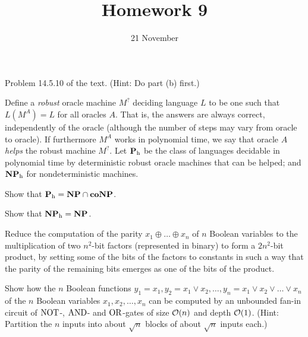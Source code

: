 \documentclass{../math167}
\title{Homework 9}
\author{}
\date{21 November}
\begin{document}
\begin{problems}
\item Problem 14.5.10 of the text.  (Hint: Do part (b) first.)

  \newcommand{\h}{_\mathrm h}

  \begin{book}

    Define a \emph{robust} oracle machine \(M^?\) deciding language
    \(L\) to be one such that \(L(M^A) = L\) for all oracles \(A\).
    That is, the answers are always correct, independently of the
    oracle (although the number of steps may vary from oracle to
    oracle).  If furthermore \(M^A\) works in polynomial time, we say
    that oracle \(A\) \emph{helps} the robust machine \(M^?\).  Let
    \(\P\h\) be the class of languages decidable in polynomial time by
    deterministic robust oracle machines that can be helped; and
    \(\NP\h\) for nondeterministic machines.
    \begin{problems}
    \item Show that \(\P\h = \NP \cap \co\NP\).
    \item Show that \(\NP\h = \NP\).
    \end{problems}
  \end{book}

  \begin{solution}
    \begin{problems}
    \item
    \item
    \end{problems}
  \end{solution}

\item Reduce the computation of the parity
  \(x_1 \oplus \dots \oplus x_n\) of \(n\) Boolean variables to the
  multiplication of two \(n^2\)-bit factors (represented in binary) to
  form a \(2n^2\)-bit product, by setting some of the bits of the
  factors to constants in such a way that the parity of the remaining
  bits emerges as one of the bits of the product.

  \begin{solution}
  \end{solution}

\item Show how the \(n\) Boolean functions
  \(y_1=x_1, y_2 = x_1 \lor x_2, \dots, y_n = x_1 \lor x_2 \lor \dots
  \lor x_n\) of the \(n\) Boolean variables \(x_1, x_2, \dots, x_n\)
  can be computed by an unbounded fan-in circuit of \(\operatorname{NOT}\)-,
  \(\operatorname{AND}\)- and \(\operatorname{OR}\)-gates of size \(\mathcal O(n)\) and depth \(\mathcal O(1)\).
  (Hint: Partition the \(n\) inputs into about \(\sqrt n\) blocks of
  about \(\sqrt n\) inputs each.)

  \begin{solution}
  \end{solution}

\end{problems}
\end{document}
